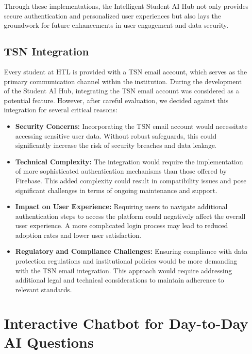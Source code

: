 Through these implementations, the Intelligent Student AI Hub not only provides secure authentication and personalized user experiences but also lays the groundwork for future enhancements in user engagement and data security.

\subsection{TSN Integration}

Every student at HTL is provided with a TSN email account, which serves as the primary communication channel within the institution. During the development of the Student AI Hub, integrating the TSN email account was considered as a potential feature. However, after careful evaluation, we decided against this integration for several critical reasons:

\begin{itemize}
    \item \textbf{Security Concerns:} Incorporating the TSN email account would necessitate accessing sensitive user data. Without robust safeguards, this could significantly increase the risk of security breaches and data leakage.
    \item \textbf{Technical Complexity:} The integration would require the implementation of more sophisticated authentication mechanisms than those offered by Firebase. This added complexity could result in compatibility issues and pose significant challenges in terms of ongoing maintenance and support.
    \item \textbf{Impact on User Experience:} Requiring users to navigate additional authentication steps to access the platform could negatively affect the overall user experience. A more complicated login process may lead to reduced adoption rates and lower user satisfaction.
    \item \textbf{Regulatory and Compliance Challenges:} Ensuring compliance with data protection regulations and institutional policies would be more demanding with the TSN email integration. This approach would require addressing additional legal and technical considerations to maintain adherence to relevant standards.
\end{itemize}


\section{Interactive Chatbot for Day-to-Day AI Questions}

